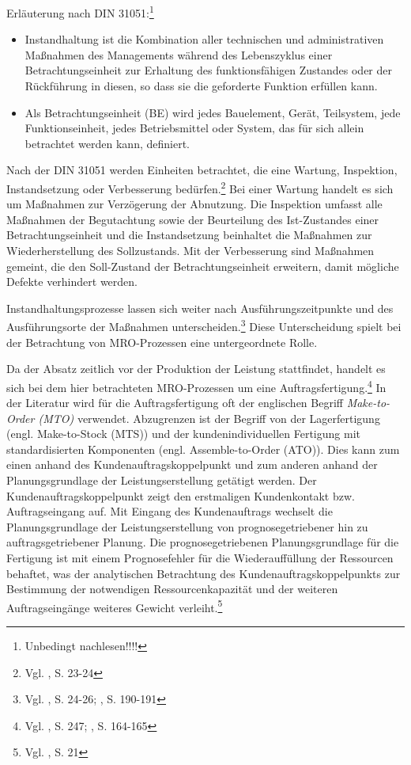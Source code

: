 Erläuterung nach DIN 31051:\footnote{Unbedingt nachlesen!!!!}
\begin{itemize}
\item Instandhaltung ist die Kombination aller technischen und administrativen Maßnahmen des Managements während des Lebenszyklus einer Betrachtungseinheit zur Erhaltung des funktionsfähigen Zustandes oder der Rückführung in diesen, so dass sie die geforderte Funktion erfüllen kann.
\item Als Betrachtungseinheit (BE) wird jedes Bauelement, Gerät, Teilsystem, jede Funktionseinheit, jedes Betriebsmittel oder System, das für sich allein betrachtet werden kann, definiert.
\end{itemize}

Nach der DIN 31051 werden Einheiten betrachtet, die eine Wartung, Inspektion, Instandsetzung oder Verbesserung bedürfen.\footnote{Vgl. \cite{schenk2010techSys}, S. 23-24} Bei einer Wartung handelt es sich um Maßnahmen zur Verzögerung der Abnutzung. Die Inspektion umfasst alle Maßnahmen der Begutachtung sowie der Beurteilung des Ist-Zustandes einer Betrachtungseinheit und die Instandsetzung beinhaltet die Maßnahmen zur Wiederherstellung des Sollzustands. Mit der Verbesserung sind Maßnahmen gemeint, die den Soll-Zustand der Betrachtungseinheit erweitern, damit mögliche Defekte verhindert werden.

Instandhaltungsprozesse lassen sich weiter nach Ausführungszeitpunkte und des Ausführungsorte der Maßnahmen unterscheiden.\footnote{Vgl. \cite{schenk2010techSys}, S. 24-26; \cite{hinsch2010instandhaltung}, S. 190-191} Diese Unterscheidung spielt bei der Betrachtung von MRO-Prozessen eine untergeordnete Rolle. 

Da der Absatz zeitlich vor der Produktion der Leistung stattfindet, handelt es sich bei dem hier betrachteten MRO-Prozessen um eine Auftragsfertigung.\footnote{Vgl. \cite{hax1956industriebetrieb}, S. 247; \cite{Gutenberg1965dispos}, S. 164-165} In der Literatur wird für die Auftragsfertigung oft der englischen Begriff \textit{Make-to-Order (MTO)} verwendet. Abzugrenzen ist der Begriff von der Lagerfertigung (engl. Make-to-Stock (MTS)) und der kundenindividuellen Fertigung mit standardisierten Komponenten (engl. Assemble-to-Order (ATO)). 
Dies kann zum einen anhand des Kundenauftragskoppelpunkt und zum anderen anhand der Planungsgrundlage der Leistungserstellung getätigt werden. Der Kundenauftragskoppelpunkt zeigt den erstmaligen Kundenkontakt bzw. Auftragseingang auf. Mit Eingang des Kundenauftrags wechselt die Planungsgrundlage der Leistungserstellung von prognosegetriebener hin zu auftragsgetriebener Planung. Die prognosegetriebenen Planungsgrundlage für die Fertigung ist mit einem Prognosefehler für die Wiederauffüllung der Ressourcen behaftet, was der analytischen Betrachtung des Kundenauftragskoppelpunkts zur Bestimmung der notwendigen Ressourcenkapazität und der weiteren Auftragseingänge weiteres Gewicht verleiht.\footnote{Vgl. \cite{quante2009management}, S. 21} 


